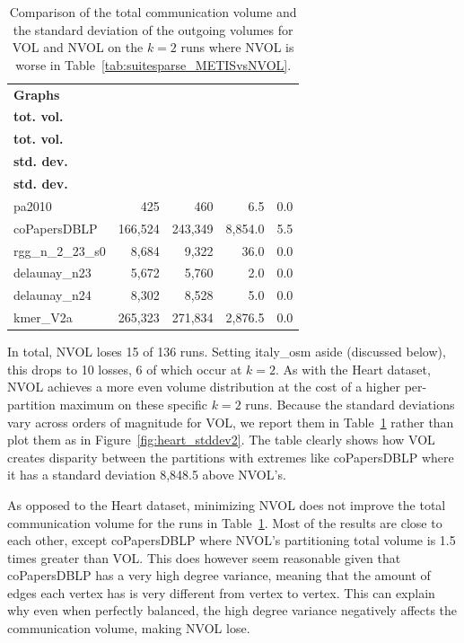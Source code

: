 \begin{table}[h]
	\centering
	\begin{tabular}{|l|r|r|r|r|}
		\hline
		\textbf{Graphs}
		& \makecell{\textbf{VOL}\\\textbf{tot. vol.}}
		& \makecell{\textbf{NVOL}\\\textbf{tot. vol.}}
		& \makecell{\textbf{VOL}\\\textbf{std. dev.}}
		& \makecell{\textbf{NVOL}\\\textbf{std. dev.}}\\
		\hline
		pa2010 & 425 & 460 & 6.5 & 0.0\\
		\hline
		coPapersDBLP & 166,524 & 243,349 & 8,854.0 & 5.5\\
		\hline
		rgg\_n\_2\_23\_s0 & 8,684 & 9,322 & 36.0 & 0.0\\
		\hline
		delaunay\_n23 & 5,672 & 5,760 & 2.0 & 0.0\\
		\hline
		delaunay\_n24 & 8,302 & 8,528 & 5.0 & 0.0\\
		\hline
		kmer\_V2a & 265,323 & 271,834 & 2,876.5 & 0.0\\
		\hline
	\end{tabular}
	\caption{Comparison of the total communication volume and the standard deviation of the outgoing volumes for VOL and NVOL on the $k=2$ runs where NVOL is worse in Table~\ref{tab:suitesparse_METISvsNVOL}.}
	\label{tab:suitesparse_2pComparison}
\end{table}

In total, NVOL loses 15 of 136 runs. Setting italy\_osm aside (discussed below), this drops to 10 losses, 6 of which occur at $k=2$. As with the Heart dataset, NVOL achieves a more even volume distribution at the cost of a higher per-partition maximum on these specific $k=2$ runs. Because the standard deviations vary across orders of magnitude for VOL, we report them in Table~\ref{tab:suitesparse_2pComparison} rather than plot them as in Figure~\ref{fig:heart_stddev2}. The table clearly shows how VOL creates disparity between the partitions with extremes like coPapersDBLP where it has a standard deviation 8,848.5 above NVOL's. 

As opposed to the Heart dataset, minimizing NVOL does not improve the total communication volume for the runs in Table~\ref{tab:suitesparse_2pComparison}. Most of the results are close to each other, except coPapersDBLP where NVOL's partitioning total volume is 1.5 times greater than VOL. This does however seem reasonable given that coPapersDBLP has a very high degree variance, meaning that the amount of edges each vertex has is very different from vertex to vertex. This can explain why even when perfectly balanced, the high degree variance negatively affects the communication volume, making NVOL lose.

